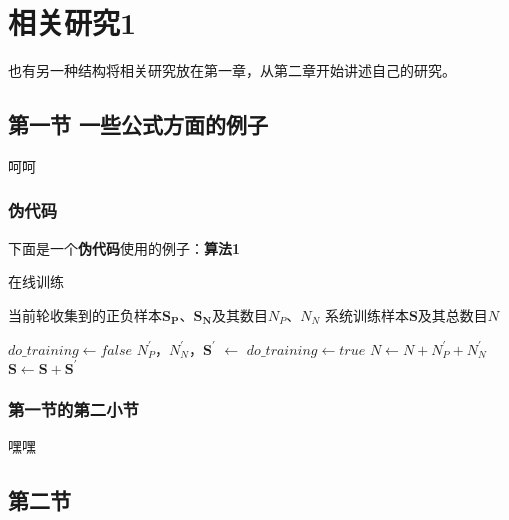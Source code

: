 
\chapter{相关研究1}

也有另一种结构将相关研究放在第一章，从第二章开始讲述自己的研究。

\section{第一节 一些公式方面的例子}

呵呵

\subsection{伪代码}

下面是一个\textbf{伪代码}使用的例子：\textbf{算法1}

\begin{algorithm}[!h]
	\caption{在线训练}
	\begin{algorithmic}[1] %
		\Require 当前轮收集到的正负样本$\boldsymbol{S_{P}}$、$\boldsymbol{S_{N}}$及其数目$N_{P}$、$N_{N}$
		\Require 系统训练样本$\boldsymbol{S}$及其总数目$N$
		
		\State \Return
		\EndIf
		
		\State $do\_training \gets false$ 
		\State $N_{P}^\prime$，$N_{N}^\prime$，$\boldsymbol{S}^\prime$ $\gets$ 
		\State {}
		\State $do\_training \gets true$
		\EndIf
		 
		\State $N \gets N + N_{P}^\prime + N_{N}^\prime$
		\State $\boldsymbol{S} \gets \boldsymbol{S} + \boldsymbol{S}^\prime$
		\EndIf
		\EndFunction
	\end{algorithmic}
\end{algorithm}

\subsection{第一节的第二小节}

嘿嘿

\section{第二节}

